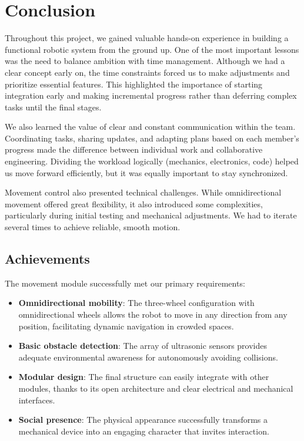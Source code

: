 \section{Conclusion}

Throughout this project, we gained valuable hands-on experience in building a functional robotic system from the ground up. One of the most important lessons was the need to balance ambition with time management. Although we had a clear concept early on, the time constraints forced us to make adjustments and prioritize essential features. This highlighted the importance of starting integration early and making incremental progress rather than deferring complex tasks until the final stages.

We also learned the value of clear and constant communication within the team. Coordinating tasks, sharing updates, and adapting plans based on each member's progress made the difference between individual work and collaborative engineering. Dividing the workload logically (mechanics, electronics, code) helped us move forward efficiently, but it was equally important to stay synchronized.

Movement control also presented technical challenges. While omnidirectional movement offered great flexibility, it also introduced some complexities, particularly during initial testing and mechanical adjustments. We had to iterate several times to achieve reliable, smooth motion.

\subsection{Achievements}

The movement module successfully met our primary requirements:

\begin{itemize}
    \item \textbf{Omnidirectional mobility}: The three-wheel configuration with omnidirectional wheels allows the robot to move in any direction from any position, facilitating dynamic navigation in crowded spaces.
    
    \item \textbf{Basic obstacle detection}: The array of ultrasonic sensors provides adequate environmental awareness for autonomously avoiding collisions.
    
    \item \textbf{Modular design}: The final structure can easily integrate with other modules, thanks to its open architecture and clear electrical and mechanical interfaces.
    
    \item \textbf{Social presence}: The physical appearance successfully transforms a mechanical device into an engaging character that invites interaction.
\end{itemize}

